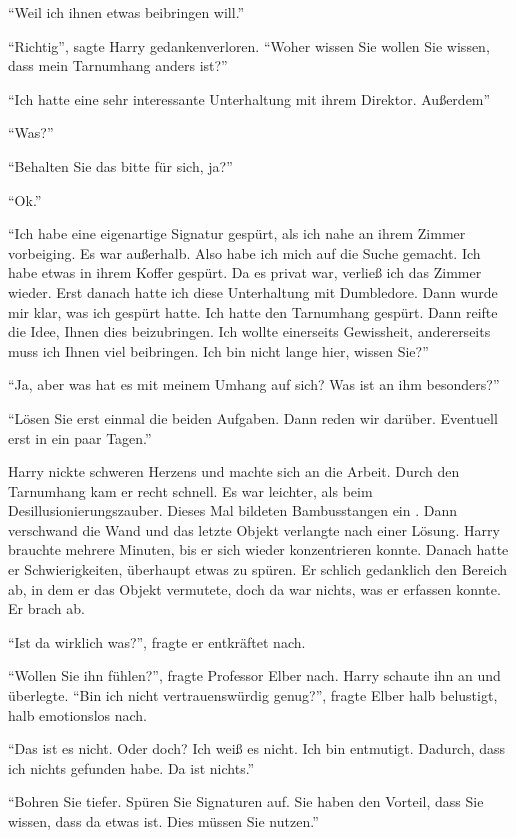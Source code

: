 \enquote{Weil ich ihnen etwas beibringen will.}

\enquote{Richtig}, sagte Harry gedankenverloren. \enquote{Woher wissen Sie \gst wollen Sie wissen, dass mein Tarnumhang anders ist?}

\enquote{Ich hatte eine sehr interessante Unterhaltung mit ihrem Direktor. Außerdem\abs}

\enquote{Was?}

\enquote{Behalten Sie das bitte für sich, ja?}

\enquote{Ok.}

\enquote{Ich habe eine eigenartige Signatur gespürt, als ich nahe an ihrem Zimmer vorbeiging. Es war außerhalb. Also habe ich mich auf die Suche gemacht. Ich habe etwas in ihrem Koffer gespürt. Da es privat war, verließ ich das Zimmer wieder. Erst danach hatte ich diese Unterhaltung mit Dumbledore. Dann wurde mir klar, was ich gespürt hatte. Ich hatte den Tarnumhang gespürt. Dann reifte die Idee, Ihnen dies beizubringen. Ich wollte einerseits Gewissheit, andererseits muss ich Ihnen viel beibringen. Ich bin nicht lange hier, wissen Sie?}

\enquote{Ja, aber was hat es mit meinem Umhang auf sich? Was ist an ihm besonders?}

\enquote{Lösen Sie erst einmal die beiden Aufgaben. Dann reden wir darüber. Eventuell erst in ein paar Tagen.}

Harry nickte schweren Herzens und machte sich an die Arbeit. Durch den Tarnumhang kam er recht schnell. Es war leichter, als beim Desillusionierungszauber. Dieses Mal bildeten Bambusstangen ein . Dann verschwand die Wand und das letzte Objekt verlangte nach einer Lösung. Harry brauchte mehrere Minuten, bis er sich wieder konzentrieren konnte. Danach hatte er Schwierigkeiten, überhaupt etwas zu spüren. Er schlich gedanklich den Bereich ab, in dem er das Objekt vermutete, doch da war nichts, was er erfassen konnte. Er brach ab.

\enquote{Ist da wirklich was?}, fragte er entkräftet nach.

\enquote{Wollen Sie ihn fühlen?}, fragte Professor Elber nach. Harry schaute ihn an und überlegte. \enquote{Bin ich nicht vertrauenswürdig genug?}, fragte Elber halb belustigt, halb emotionslos nach.

\enquote{Das ist es nicht. Oder doch? Ich weiß es nicht. Ich bin entmutigt. Dadurch, dass ich nichts gefunden habe. Da ist nichts.}

\enquote{Bohren Sie tiefer. Spüren Sie Signaturen auf. Sie haben den Vorteil, dass Sie wissen, dass da etwas ist. Dies müssen Sie nutzen.}


